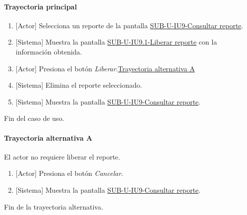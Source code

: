 \paragraph{Trayectoria principal}
	\begin{enumerate}
		\item {[Actor]} Selecciona un reporte de la pantalla \hyperref[fig:sub-u-iu9]{SUB-U-IU9-Consultar reporte}.
		\item {[Sistema]} Muestra la pantalla \hyperref[fig:sub-u-iu9.1]{SUB-U-IU9.1-Liberar reporte} con la información obtenida.
		\item {[Actor]} Presiona el botón \textit{Liberar}.\hyperref[SUB-U-CU9.1:TA]{Trayectoria alternativa A}
		\item {[Sistema]} Elimina el reporte seleccionado.
		\item {[Sistema]} Muestra la pantalla \hyperref[fig:sub-u-iu9]{SUB-U-IU9-Consultar reporte}.
	\end{enumerate}
	Fin del caso de uso.

\paragraph{Trayectoria alternativa A} \label{SUB-U-CU9.1:TA}
	El actor no requiere liberar el reporte.
	\begin{enumerate}[label=A\arabic*.]
		\item {[Actor]} Presiona el botón \textit{Cancelar}.
		\item {[Sistema]} Muestra la pantalla \hyperref[fig:sub-u-iu9]{SUB-U-IU9-Consultar reporte}.
	\end{enumerate}
	Fin de la trayectoria alternativa.
